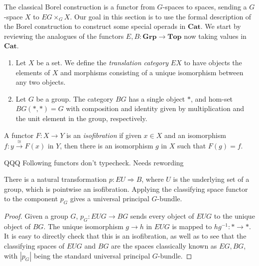\documentclass{amsbook} %
\newcommand{\mb}{\mathbf}
\numberwithin{section}{chapter}
\begin{document}
The classical Borel construction is a functor from $G$-spaces to spaces, sending a $G$-space $X$ to $EG \times_{G} X$.  Our goal in this section is to use the formal description of the Borel construction to construct some special operads in $\mb{Cat}$.   We start by reviewing the analogues of the functors $E, B \colon \mb{Grp} \rightarrow \mb{Top}$ now taking values in $\mb{Cat}$.

\begin{Defi}\label{Defi:e_b}
\begin{enumerate}
\item Let $X$ be a set.  We define the \textit{translation category} $EX$ to have objects the elements of $X$ and morphisms consisting of a unique isomorphism between any two objects.
\item Let $G$ be a group.  The category $BG$ has a single object $*$, and hom-set $BG(*,*) = G$ with composition and identity given by multiplication and the unit element in the group, respectively.
\end{enumerate}
\end{Defi}

\begin{Defi}
A functor $F \colon X \to Y$ is an \emph{isofibration} if given $x \in X$ and an isomorphism $f\colon y \xrightarrow{\cong} F(x)$ in $Y$, then there is an isomorphism $g$ in $X$ such that $F(g) = f$.
\end{Defi}
QQQ Following functors don't typecheck. Needs rewording
\begin{prop}
There is a natural transformation $p \colon EU \Rightarrow B$, where $U$ is the underlying set of a group, which is pointwise an isofibration.  Applying the classifying space functor to the component $p_{G}$ gives a universal principal $G$-bundle.
\end{prop}
\begin{proof}
Given a group $G$, $p_{G} \colon EUG \rightarrow BG$ sends every object of $EUG$ to the unique object of $BG$.  The unique isomorphism $g \rightarrow  h$ in $EUG$ is mapped to $hg^{-1} \colon * \rightarrow *$.  It is easy to directly check that this is an isofibration, as well as to see that the classifying spaces of $EUG$ and $BG$ are the spaces classically known as $EG,BG$, with $|p_{G}|$ being the standard universal principal $G$-bundle.
\end{proof}
\end{document}
